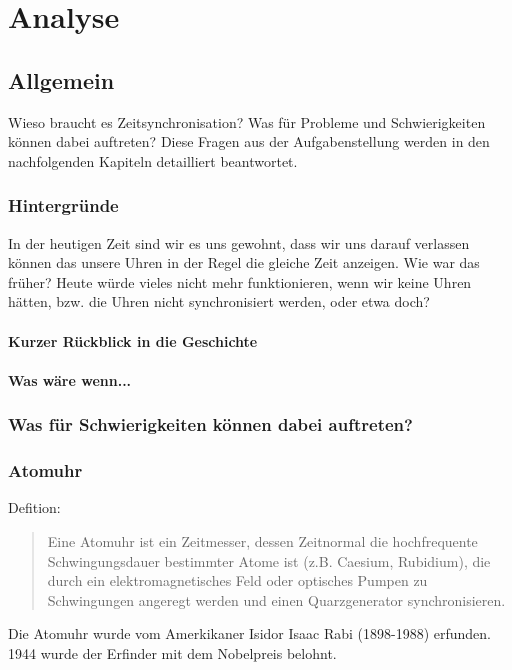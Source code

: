 
\chapter{Analyse}

\section{Allgemein}
Wieso braucht es Zeitsynchronisation? Was für Probleme und Schwierigkeiten können dabei auftreten? Diese Fragen aus der Aufgabenstellung werden in den nachfolgenden Kapiteln detailliert beantwortet.

\subsection{Hintergründe}
In der heutigen Zeit sind wir es uns gewohnt, dass wir uns darauf verlassen können das unsere Uhren in der Regel die gleiche Zeit anzeigen. 
Wie war das früher? Heute würde vieles nicht mehr funktionieren, wenn wir keine Uhren hätten, bzw. die Uhren nicht synchronisiert werden, oder etwa doch?

\subsubsection{Kurzer Rückblick in die Geschichte}
\subsubsection{Was wäre wenn...}

\subsection{Was für Schwierigkeiten können dabei auftreten?}

\subsection{Atomuhr}
Defition:
\begin{quote}
Eine Atomuhr ist ein Zeitmesser, dessen Zeitnormal die hochfrequente Schwingungsdauer bestimmter Atome ist (z.B. Caesium, Rubidium), die durch ein elektromagnetisches Feld oder optisches Pumpen zu Schwingungen angeregt werden und einen Quarzgenerator synchronisieren.
\end{quote} %
Die Atomuhr wurde vom Amerkikaner Isidor Isaac Rabi (1898-1988) erfunden. 1944 wurde der Erfinder mit dem Nobelpreis belohnt.


